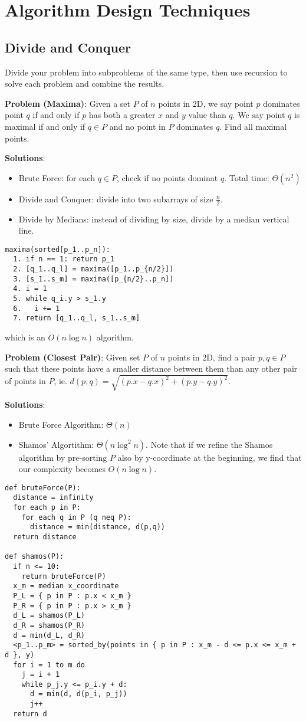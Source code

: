 \documentclass[12pt]{article}
\begin{document}
\section{Algorithm Design Techniques}
\subsection{Divide and Conquer}
Divide your problem into subproblems of the same type, then use recursion to solve each problem and combine the results.

{\bf Problem (Maxima)}: Given a set $P$ of $n$ points in 2D, we say point $p$ dominates point $q$ if and only if $p$ has both a greater $x$ and $y$ value than $q$. We say point $q$ is maximal if and only if $q \in P$ and no point in $P$ dominates $q$. Find all maximal points.

{\bf Solutions}:
\begin{itemize}
\item Brute Force: for each $q \in P$, check if no points dominat $q$. Total time: $\Theta(n^2)$
\item Divide and Conquer: divide into two subarrays of size $\frac{n}{2}$.
\item Divide by Medians: instead of dividing by size, divide by a median vertical line.
\end{itemize}

\begin{verbatim}
maxima(sorted[p_1..p_n]):
  1. if n == 1: return p_1
  2. [q_1..q_l] = maxima([p_1..p_{n/2}])
  3. [s_1..s_m] = maxima([p_{n/2}..p_n])
  4. i = 1
  5. while q_i.y > s_1.y
  6.   i += 1
  7. return [q_1..q_l, s_1..s_m]
\end{verbatim}
which is an $O(n\log n)$ algorithm.

{\bf Problem (Closest Pair)}: Given set $P$ of $n$ points in 2D, find a pair $p, q \in P$ such that these points have a smaller distance between them than any other pair of points in $P$, ie. $d(p,q) = \sqrt{(p.x - q.x)^2 + (p.y - q.y)^2}$.

{\bf Solutions}:
\begin{itemize}
\item Brute Force Algorithm: $\Theta(n)$
\item Shamos' Algortithm: $\Theta(n\log^2 n)$. Note that if we refine the Shamos algorithm by pre-sorting $P$ also by y-coordinate at the beginning, we find that our complexity becomes $O(n\log n)$.
\end{itemize}

\begin{verbatim}
def bruteForce(P):
  distance = infinity
  for each p in P:
    for each q in P (q neq P):
      distance = min(distance, d(p,q))
  return distance

def shamos(P):
  if n <= 10:
    return bruteForce(P)
  x_m = median x_coordinate
  P_L = { p in P : p.x < x_m }
  P_R = { p in P : p.x > x_m }
  d_L = shamos(P_L)
  d_R = shamos(P_R)
  d = min(d_L, d_R)
  <p_1..p_m> = sorted_by(points in { p in P : x_m - d <= p.x <= x_m + d }, y)
  for i = 1 to m do
    j = i + 1
    while p_j.y <= p_i.y + d:
      d = min(d, d(p_i, p_j))
      j++
  return d
\end{verbatim}
\end{document}

